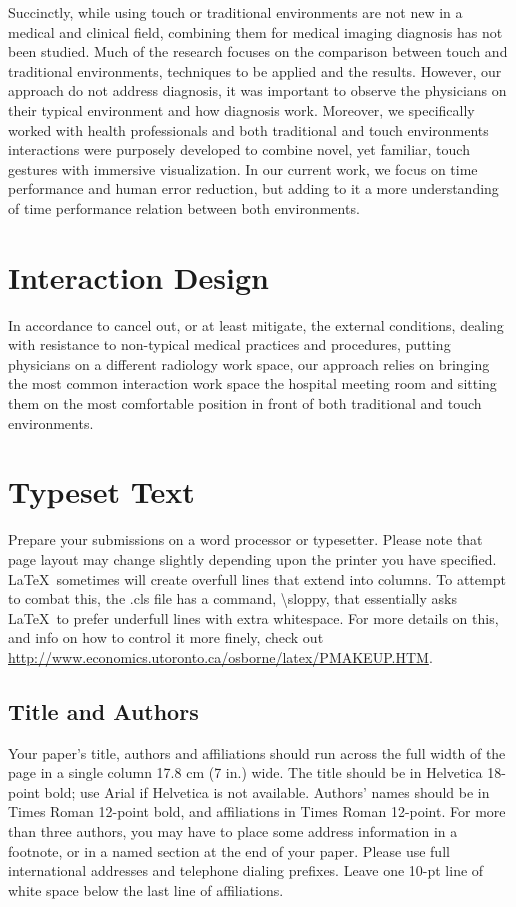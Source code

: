 \documentclass{sigchi}
\begin{document}
Succinctly, while using touch or traditional environments are not new in a medical and clinical field, combining them for medical imaging diagnosis has not been studied. Much of the research focuses on the comparison between touch and traditional environments, techniques to be applied and the results. However, our approach do not address diagnosis, it was important to observe the physicians on their typical environment and how diagnosis work. Moreover, we specifically worked with health professionals and both traditional and touch environments interactions were purposely developed to combine novel, yet familiar, touch gestures with immersive visualization. In our current work, we focus on time performance and human error reduction, but adding to it a more understanding of time performance relation between both environments.

\section{Interaction Design}

In accordance to cancel out, or at least mitigate, the external conditions, dealing with resistance to non-typical medical practices and procedures, putting physicians on a different radiology work space, our approach relies on bringing the most common interaction work space the hospital meeting room and sitting them on the most comfortable position in front of both traditional and touch environments.

\section{Typeset Text}

Prepare your submissions on a word processor or typesetter.  Please
note that page layout may change slightly depending upon the printer
you have specified.  \LaTeX\ sometimes will create overfull lines
that extend into columns.  To attempt to combat this, the .cls
file has a command, {\textbackslash}sloppy, that essentially asks
\LaTeX\ to prefer underfull lines with extra whitespace.  For more
details on this, and info on how to control it more finely, check out
{\url{http://www.economics.utoronto.ca/osborne/latex/PMAKEUP.HTM}}.

\subsection{Title and Authors}

Your paper's title, authors and affiliations should run across the
full width of the page in a single column 17.8 cm (7 in.) wide.  The
title should be in Helvetica 18-point bold; use Arial if Helvetica is
not available.  Authors' names should be in Times Roman 12-point bold,
and affiliations in Times Roman 12-point.  For more than three authors,
you may have to place some address information in a footnote, or in a named
section at the end of your paper. Please use full international addresses and
telephone dialing prefixes.  Leave one 10-pt line of white space below the last
line of affiliations.
\end{document}
